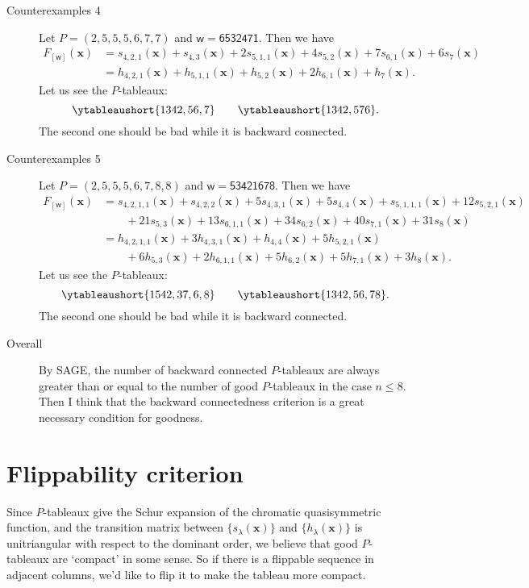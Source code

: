 \documentclass[12pt,a4paper,reqno]{amsart}
\theoremstyle{definition}
\theoremstyle{remark}
\newcommand\xx{\mathbf{x}}
\newcommand\ww{\mathsf{w}}
\begin{document}
\begin{description}
  \item[Counterexamples 4] Let \( P=(2, 5, 5, 5, 6, 7, 7) \) and \( \ww=\mathsf{6532471} \).
  Then we have
  \begin{align*}
    F_{[\ww]}(\xx)
      &= s_{4,2,1}(\xx) + s_{4,3}(\xx) + 2 s_{5,1,1}(\xx) + 4 s_{5,2}(\xx) + 7 s_{6,1}(\xx) + 6 s_{7}(\xx) \\
      &= h_{4,2,1}(\xx) + h_{5,1,1}(\xx) + h_{5,2}(\xx) + 2 h_{6,1}(\xx) + h_{7}(\xx).
  \end{align*}
  Let us see the \( P \)-tableaux:
  \[
    \ytableaushort{1342,56,7} \qquad \ytableaushort{1342,576}.
  \]
  The second one should be bad while it is backward connected.
  \item[Counterexamples 5] Let \( P=(2, 5, 5, 5, 6, 7, 8, 8) \) and \( \ww=\mathsf{53421678} \).
  Then we have
  \begin{align*}
    F_{[\ww]}(\xx)
      &= s_{4,2,1,1}(\xx) + s_{4,2,2}(\xx) + 5 s_{4,3,1}(\xx) + 5 s_{4,4}(\xx) + s_{5,1,1,1}(\xx) + 12 s_{5,2,1}(\xx)\\
        &\qquad + 21 s_{5,3}(\xx) + 13 s_{6,1,1}(\xx) + 34 s_{6,2}(\xx) + 40 s_{7,1}(\xx) + 31 s_{8}(\xx) \\
      &= h_{4,2,1,1}(\xx) + 3 h_{4,3,1}(\xx) + h_{4,4}(\xx) + 5 h_{5,2,1}(\xx) \\
        &\qquad + 6 h_{5,3}(\xx) + 2 h_{6,1,1}(\xx) + 5 h_{6,2}(\xx) + 5 h_{7,1}(\xx) + 3 h_{8}(\xx).
  \end{align*}
  Let us see the \( P \)-tableaux:
  \[
    \ytableaushort{1542,37,6,8} \qquad \ytableaushort{1342,56,78}.
  \]
  The second one should be bad while it is backward connected.
  \item[Overall] By SAGE, the number of backward connected \( P \)-tableaux are always greater than
  or equal to the number of good \( P \)-tableaux in the case \( n\le 8 \). Then I think that
  the backward connectedness criterion is a great necessary condition for goodness.
\end{description}

\section{Flippability criterion}
Since \( P \)-tableaux give the Schur expansion of the chromatic quasisymmetric function, and 
the transition matrix between \( \{s_\lambda(\xx)\} \) and \( \{h_\lambda(\xx)\} \) is
unitriangular with respect to the dominant order, we believe that good \( P \)-tableaux are
`compact' in some sense. So if there is a flippable sequence in adjacent columns,
we'd like to flip it to make the tableau more compact.
\end{document}

